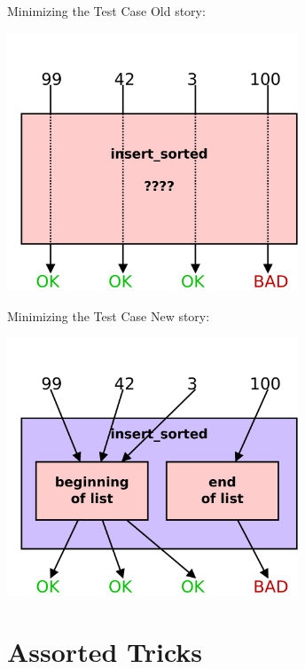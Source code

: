 \documentclass[xcolor=dvipsnames]{beamer}
\begin{document}
\begin{frame}{Minimizing the Test Case}
	Old story:

	\begin{center}
	\includegraphics[width=0.65\textwidth]{space0.png}
	\end{center}
\end{frame}
\begin{frame}{Minimizing the Test Case}
	New story:

	\begin{center}
	\includegraphics[width=0.65\textwidth]{space1.png}
	\end{center}
\end{frame}

\section{Assorted Tricks}

\end{document}
